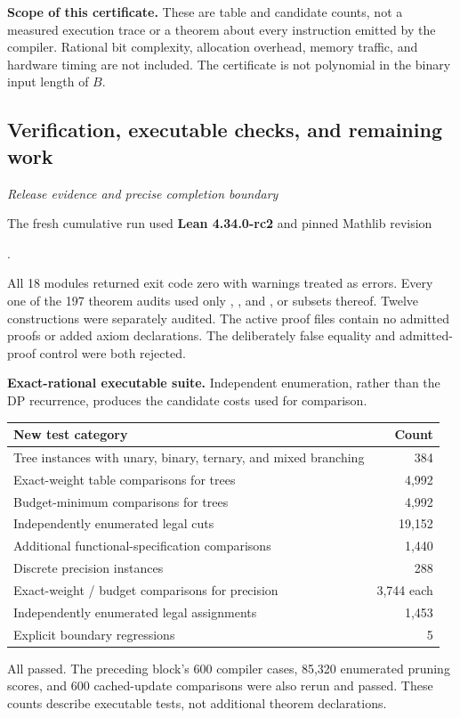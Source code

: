 \textbf{Scope of this certificate.} These are table and candidate counts, not a measured execution trace or a theorem about every instruction emitted by the compiler. Rational bit complexity, allocation overhead, memory traffic, and hardware timing are not included. The certificate is not polynomial in the binary input length of $B$.



\subsection{Verification, executable checks, and remaining work}\label{supp3:subsection:007}\textit{Release evidence and precise completion boundary}\par
The fresh cumulative run used \textbf{Lean 4.34.0-rc2} and pinned Mathlib revision
\begin{center}.\end{center}
All 18 modules returned exit code zero with warnings treated as errors. Every one of the 197 theorem audits used only , , and , or subsets thereof. Twelve constructions were separately audited. The active proof files contain no admitted proofs or added axiom declarations. The deliberately false equality and admitted-proof control were both rejected.

\textbf{Exact-rational executable suite.} Independent enumeration, rather than the DP recurrence, produces the candidate costs used for comparison.
\begin{center}\small
\renewcommand{\arraystretch}{1.18}
\begin{tabular}{@{}p{}r@{}}
\toprule
New test category & Count\\
\midrule
Tree instances with unary, binary, ternary, and mixed branching & 384\\
Exact-weight table comparisons for trees & 4,992\\
Budget-minimum comparisons for trees & 4,992\\
Independently enumerated legal cuts & 19,152\\
Additional functional-specification comparisons & 1,440\\
Discrete precision instances & 288\\
Exact-weight / budget comparisons for precision & 3,744 each\\
Independently enumerated legal assignments & 1,453\\
Explicit boundary regressions & 5\\
\bottomrule
\end{tabular}
\end{center}
All passed. The preceding block's 600 compiler cases, 85,320 enumerated pruning scores, and 600 cached-update comparisons were also rerun and passed. These counts describe executable tests, not additional theorem declarations.

